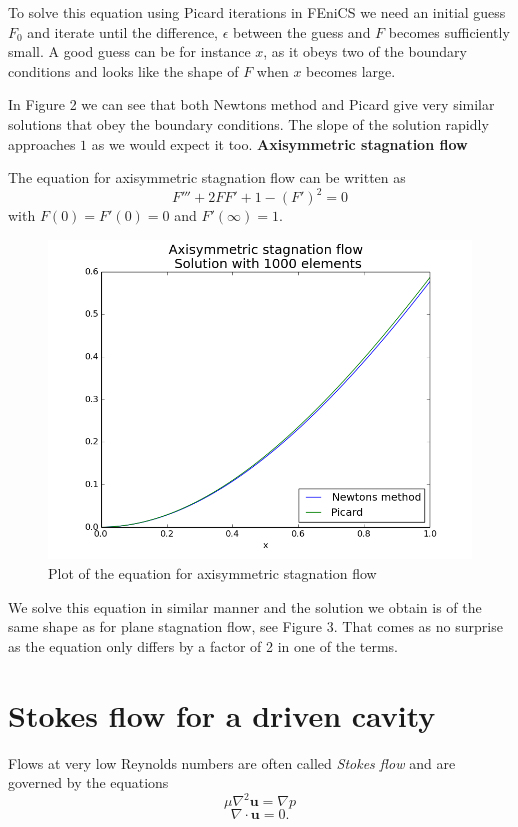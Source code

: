 \documentclass[11pt,a4paper,english]{article}
\numberwithin{equation}{section}
\begin{document}
To solve this equation using Picard iterations in FEniCS we need an initial guess $F_0$ and iterate until the difference, $\epsilon$ between the guess and $F$ becomes sufficiently small. A good guess can be  for instance $x$, as it obeys two of the boundary conditions and looks like the shape of $F$ when $x$ becomes large.   

In Figure 2 we can see that both Newtons method and Picard give very similar solutions that obey the boundary conditions. The slope of the solution rapidly approaches $1$ as we would expect it too.     
\newpage
\textbf{Axisymmetric stagnation flow}

The equation for axisymmetric stagnation flow can be written as
\begin{equation}
F''' + 2FF' + 1 - (F')^2 = 0
\end{equation}
with $F(0) = F'(0) = 0$ and $F'(\infty)=1$.

\begin{figure}[h!]
\begin{center}
  \includegraphics[scale=0.4]{axisym_stag.png}
  \end{center}
  \caption{Plot of the equation for axisymmetric stagnation flow}
  \label{fig:stokes_square}
\end{figure}

We solve this equation in similar manner and the solution we obtain is of the same shape as for plane stagnation flow, see Figure 3. That comes as no surprise as the equation only differs by a factor of 2 in one of the terms.   

\section{Stokes flow for a driven cavity}
Flows at very low Reynolds numbers are often called \emph{Stokes flow} and are governed by the equations 
\begin{equation}
\mu \nabla^2 \mathbf{u} = \nabla p
\end{equation}
\begin{equation}
\nabla \cdot \mathbf{u} = 0.
\end{equation}
\end{document}
